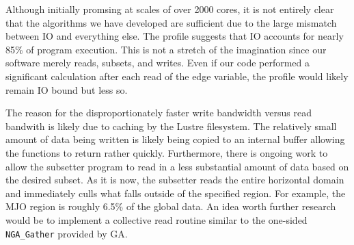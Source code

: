 Although initially promsing at scales of over 2000 cores, it is not entirely
clear that the algorithms we have developed are sufficient due to the large
mismatch between IO and everything else.  The profile suggests that IO
accounts for nearly 85\% of program execution.  This is not a stretch of the
imagination since our software merely reads, subsets, and writes.  Even if our
code performed a significant calculation after each read of the edge variable,
the profile would likely remain IO bound but less so.

The reason for the disproportionately faster write bandwidth versus read
bandwith is likely due to caching by the Lustre filesystem.  The relatively
small amount of data being written is likely being copied to an internal
buffer allowing the functions to return rather quickly.  Furthermore, there is
ongoing work to allow the subsetter program to read in a less substantial
amount of data based on the desired subset.  As it is now, the subsetter reads
the entire horizontal domain and immediately culls what falls outside of the
specified region.  For example, the MJO region is roughly 6.5\% of the global
data.  An idea worth further research would be to implement a collective read
routine similar to the one-sided \verb+NGA_Gather+ provided by GA.





